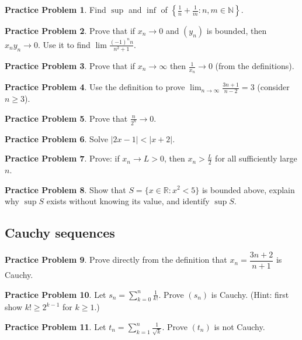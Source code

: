 \documentclass[11pt]{article}
\theoremstyle{definition}
\newtheorem{prob}{Practice Problem}
\newcommand{\N}{\mathbb{N}}
\newcommand{\R}{\mathbb{R}}
\begin{document}
\begin{prob}
Find $\sup$ and $\inf$ of $\left\{\frac1n+\frac1m:n,m\in\N\right\}$.
\end{prob}

\begin{prob}
Prove that if $x_n\to0$ and $(y_n)$ is bounded, then $x_ny_n\to0$. Use it
to find $\lim\frac{(-1)^n n}{n^2+1}$.
\end{prob}

\begin{prob}
Prove that if $x_n\to\infty$ then $\frac1{x_n}\to0$ (from the definitions).
\end{prob}

\begin{prob}
Use the definition to prove $\displaystyle\lim_{n\to\infty}\frac{3n+1}{n-2}=3$
(consider $n\ge3$).
\end{prob}

\begin{prob}
Prove that $\frac{n}{2^n}\to0$.
\end{prob}

\begin{prob}
Solve $|2x-1|<|x+2|$.
\end{prob}

\begin{prob}
Prove: if $x_n\to L>0$, then $x_n>\frac L2$ for all sufficiently large $n$.
\end{prob}

\begin{prob}
Show that $S=\{x\in\R:x^2<5\}$ is bounded above, explain why $\sup S$
exists without knowing its value, and identify $\sup S$.
\end{prob}

\subsection*{Cauchy sequences}

\begin{prob}\label{prob:c1}
Prove directly from the definition that $x_n=\dfrac{3n+2}{n+1}$ is Cauchy.
\end{prob}

\begin{prob}\label{prob:c2}
Let $s_n=\sum_{k=0}^n\frac1{k!}$. Prove $(s_n)$ is Cauchy. (Hint: first show
$k!\ge2^{k-1}$ for $k\ge1$.)
\end{prob}

\begin{prob}\label{prob:c3}
Let $t_n=\sum_{k=1}^n\frac1{\sqrt k}$. Prove $(t_n)$ is not Cauchy.
\end{prob}
\end{document}
